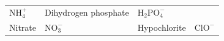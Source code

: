 {\begin{center}
\begin{xtabular*}{\mytablewidth}[t]{|p{10\mystarwidth}|p{10\mystarwidth}|p{10\mystarwidth}|p{10\mystarwidth}|}
    
        \begin{math}\mathrm{NH}_{4}^{+}\end{math} &
    
    
        Dihydrogen phosphate &
    
    
        \begin{math}{\mathrm{H}}_{2}\mathrm{PO}_{4}^{-}\end{math}%
     \tabularnewline{}
    
    
        Nitrate &
    
    
        \begin{math}\mathrm{NO}_{3}^{-}\end{math} &
    
    
        Hypochlorite &
    
    
        \begin{math}{\mathrm{ClO}}^{-}\end{math}%
     \tabularnewline{}
    

\end{xtabular*}
\end{center}}
